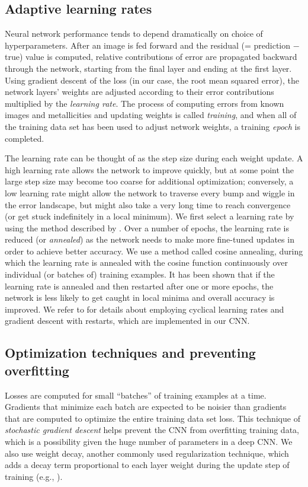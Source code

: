 \documentclass[fleqn,usenatbib]{mnras}
\newcommand{\eg}{e.g.}
\newcommand{\citeeg}[1]{(\eg, \citealt{#1})}
\begin{document}
\subsection{Adaptive learning rates}
Neural network performance tends to depend dramatically on choice of hyperparameters. After an image is fed forward and the residual (= prediction $-$ true) value is computed, relative contributions of error are propagated backward through the network, starting from the final layer and ending at the first layer. Using gradient descent of the loss (in our case, the root mean squared error), the network layers' weights are adjusted according to their error contributions multiplied by the \textit{learning rate}. The process of computing errors from known images and metallicities and updating weights is called \textit{training}, and when all of the training data set has been used to adjust network weights, a training \textit{epoch} is completed.

The learning rate can be thought of as the step size during each weight update. A high learning rate allows the network to improve quickly, but at some point the large step size may become too coarse for additional optimization; conversely, a low learning rate might allow the network to traverse every bump and wiggle in the error landscape, but might also take a very long time to reach convergence (or get stuck indefinitely in a local minimum). We first select a learning rate by using the method described by \cite{CLR}. Over a number of epochs, the learning rate is reduced (or \textit{annealed}) as the network needs to make more fine-tuned updates in order to achieve better accuracy. We use a method called cosine annealing, during which the learning rate is annealed with the cosine function continuously over individual (or batches of) training examples.
It has been shown that if the learning rate is annealed and then restarted after one or more epochs, the network is less likely to get caught in local minima and overall accuracy is improved. We refer to \cite{SGDR} for details about employing cyclical learning rates and gradient descent with restarts, which are implemented in our CNN.

\subsection{Optimization techniques and preventing overfitting} \label{sec:optimization}

Losses are computed for small ``batches'' of training examples at a time. Gradients that minimize each batch are expected to be noisier than gradients that are computed to optimize the entire training data set loss. This technique of \textit{stochastic gradient descent} helps prevent the CNN from overfitting training data, which is a possibility given the huge number of parameters in a deep CNN. We also use weight decay, another commonly used regularization technique, which adds a decay term proportional to each layer weight during the update step of training \citeeg{Krogh1992}.
\end{document}
